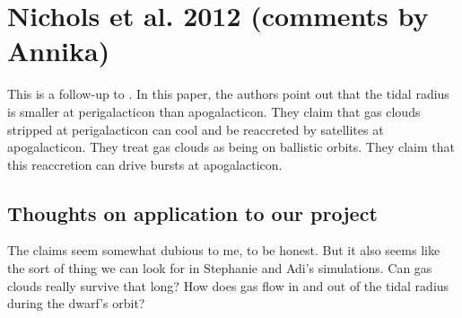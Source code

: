 \documentclass[11pt,longbibliography]{article}
\begin{document}
\section{Nichols et al. 2012 (comments by Annika)}

This is a follow-up to \citet{nichols2011}.  In this paper, the authors point out that the tidal radius is smaller at perigalacticon than apogalacticon.  They claim that gas clouds stripped at perigalacticon can cool and be reaccreted by satellites at apogalacticon.  They treat gas clouds as being on ballistic orbits.  They claim that this reaccretion can drive bursts at apogalacticon.


\subsection{Thoughts on application to our project}
The claims seem somewhat dubious to me, to be honest.  But it also seems like the sort of thing we can look for in Stephanie and Adi's simulations.  Can gas clouds really survive that long?  How does gas flow in and out of the tidal radius during the dwarf's orbit?





\end{document}

